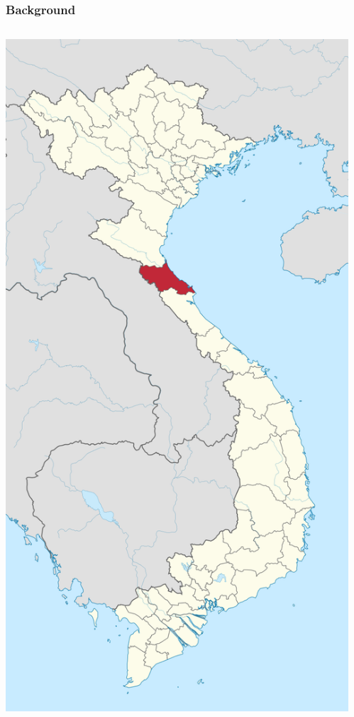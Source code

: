 \documentclass[10pt,dvipsnames]{beamer}
\begin{document}
\begin{frame}
  \frametitle{Background}
  \begin{columns}
    \begin{column}{0.5\linewidth}
      \includegraphics[width=0.75\linewidth]{pics/Ha-Tinh.png}
    \end{column}
    \begin{column}{0.5\linewidth}

\end{column}
\end{columns}
\end{frame}
\end{document}
